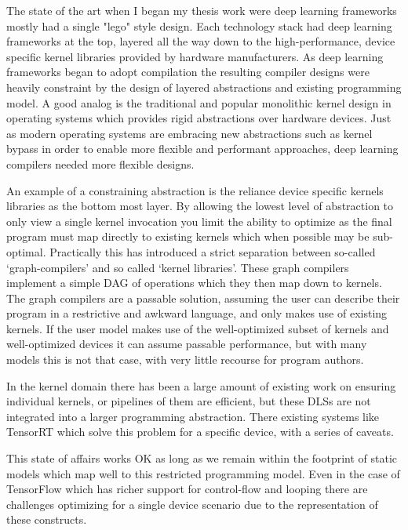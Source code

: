 The state of the art when I began my thesis work were
  deep learning frameworks mostly had a single "lego" style design.
Each technology stack had deep learning frameworks at the top,
  layered all the way down to the high-performance,
  device specific kernel libraries provided by hardware manufacturers.
As deep learning frameworks began to adopt compilation
  the resulting compiler designs were heavily constraint by the
  design of layered abstractions and existing programming model.
A good analog is the traditional and popular monolithic kernel design
  in operating systems which provides rigid abstractions over
  hardware devices.
Just as modern operating systems are embracing new abstractions
  such as kernel bypass in order to enable more flexible and
  performant approaches, deep learning compilers needed more
  flexible designs.

An example of a constraining abstraction is the reliance
  device specific kernels libraries as the bottom most layer.
By allowing the lowest level of abstraction to only view a single
  kernel invocation you limit the ability to optimize as the final
  program must map directly to existing kernels which when possible
  may be sub-optimal.
Practically this has introduced a strict separation between so-called
  ‘graph-compilers’ and so called ‘kernel libraries’.
These graph compilers implement a simple DAG of operations
  which they then map down to kernels.
The graph compilers are a passable solution, assuming the user can describe their program
  in a restrictive and awkward language, and only makes use of existing kernels.
If the user model makes use of the well-optimized subset of kernels and well-optimized devices
  it can assume passable performance, but with many models this is not that case, with very little recourse for program authors.

In the kernel domain there has been a large amount of existing work on
  ensuring individual kernels, or pipelines of them are efficient,
  but these DLSs are not integrated into a larger programming abstraction.
There existing systems like TensorRT which solve this problem for a specific device,
  with a series of caveats.

This state of affairs works OK as long as we remain within the footprint of static
  models which map well to this restricted programming model.
Even in the case of TensorFlow which has richer support for control-flow and
  looping there are challenges optimizing for a single device scenario due
  to the representation of these constructs.

